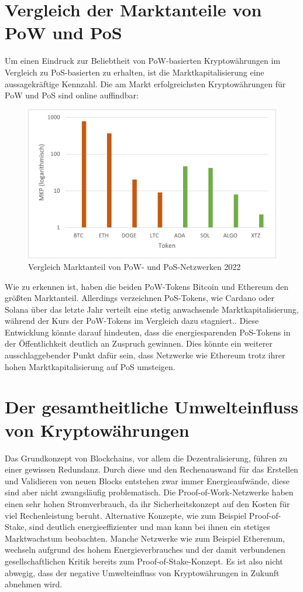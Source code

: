 \documentclass[12pt]{article}
\begin{document}
\section{Vergleich der Marktanteile von PoW und PoS}
Um einen Eindruck zur Beliebtheit von PoW-basierten Kryptowährungen im Vergleich zu PoS-basierten zu erhalten, ist die Marktkapitalisierung eine aussagekräftige Kennzahl. Die am Markt erfolgreichsten Kryptowährungen für PoW und PoS  sind online auffindbar:
\FloatBarrier
\begin{figure}[ht!]
    \centering
    \includegraphics[width=.75\textwidth]{quellen/mkp_pow_pos.png}
    \caption{Vergleich Marktanteil von PoW- und PoS-Netzwerken 2022}
\end{figure}
\FloatBarrier
\noindent Wie zu erkennen ist, haben die beiden PoW-Tokens Bitcoin und Ethereum den größten Marktanteil. Allerdings verzeichnen PoS-Tokens, wie Cardano oder Solana über das letzte Jahr verteilt eine stetig anwachsende Marktkapitalisierung, während der Kurs der PoW-Tokens im Vergleich dazu stagniert.. Diese Entwicklung könnte darauf hindeuten, dass die energiesparenden PoS-Tokens in der Öffentlichkeit deutlich an Zuspruch gewinnen. Dies könnte ein weiterer ausschlaggebender Punkt dafür sein, dass Netzwerke wie Ethereum trotz ihrer hohen Marktkapitalisierung auf PoS umsteigen.

\section{Der gesamtheitliche Umwelteinfluss von Kryptowährungen}
Das Grundkonzept von Blockchains, vor allem die Dezentralisierung, führen zu einer gewissen Redundanz. Durch diese und den Rechenauswand für das Erstellen und Validieren von neuen Blocks entstehen zwar immer Energieaufwände, diese sind aber nicht zwangsläufig problematisch. Die Proof-of-Work-Netzwerke haben einen sehr hohen Stromverbrauch, da ihr Sicherheitskonzept auf den Kosten für viel Rechenleistung beruht. Alternative Konzepte, wie zum Beispiel Proof-of-Stake, sind deutlich energieeffizienter und man kann bei ihnen ein stetiges Marktwachstum beobachten. Manche Netzwerke wie zum Beispiel Etherenum, wechseln aufgrund des hohem Energieverbrauches und der damit verbundenen gesellschaftlichen Kritik bereits zum Proof-of-Stake-Konzept. Es ist also nicht abwegig, dass der negative Umwelteinfluss von Kryptowährungen in Zukunft abnehmen wird.
\end{document}
